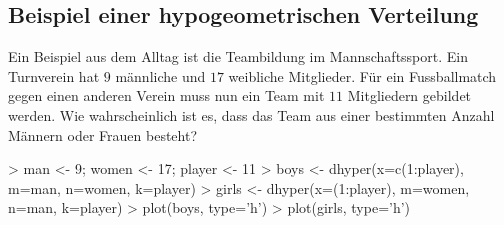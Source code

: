 \subsection{Beispiel einer hypogeometrischen Verteilung}
Ein Beispiel aus dem Alltag ist die Teambildung im Mannschaftssport.
Ein Turnverein hat $9$ männliche und $17$ weibliche Mitglieder. Für ein
Fussballmatch gegen einen anderen Verein muss nun ein Team mit $11$
Mitgliedern gebildet werden. Wie wahrscheinlich ist es, dass das
Team aus einer bestimmten Anzahl Männern oder Frauen besteht?
\begin{Schunk}
\begin{Sinput}
> man <- 9; women <- 17; player <- 11
> boys <- dhyper(x=c(1:player), m=man, n=women, k=player)
> girls <- dhyper(x=(1:player), m=women, n=man, k=player)
> plot(boys, type='h')
> plot(girls, type='h')
\end{Sinput}
\end{Schunk}

